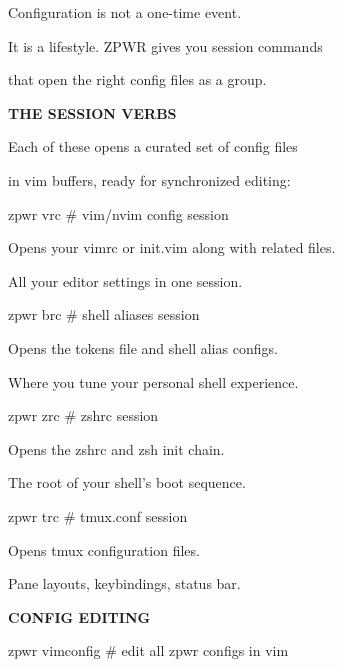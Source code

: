\documentclass[11pt,a4paper,twoside]{book}
\begin{document}
Configuration is not a one-time event.

It is a lifestyle. ZPWR gives you session commands

that open the right config files as a group.


\vspace{12pt}
{\bfseries\color{neonyellow} THE SESSION VERBS}\vspace{4pt}

Each of these opens a curated set of config files

\begin{codebox}
in vim buffers, ready for synchronized editing:\\
\end{codebox}

\begin{codebox}
zpwr vrc          \# vim/nvim config session\\
\end{codebox}

Opens your vimrc or init.vim along with related files.

All your editor settings in one session.

\begin{codebox}
zpwr brc          \# shell aliases session\\
\end{codebox}

Opens the tokens file and shell alias configs.

Where you tune your personal shell experience.

\begin{codebox}
zpwr zrc          \# zshrc session\\
\end{codebox}

Opens the zshrc and zsh init chain.

The root of your shell's boot sequence.

\begin{codebox}
zpwr trc          \# tmux.conf session\\
\end{codebox}

Opens tmux configuration files.

Pane layouts, keybindings, status bar.


\vspace{12pt}
{\bfseries\color{neonyellow} CONFIG EDITING}\vspace{4pt}

\begin{codebox}
zpwr vimconfig    \# edit all zpwr configs in vim\\
\end{codebox}
\end{document}
